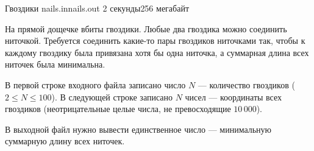 \begin{problem}{Гвоздики}
{nails.in}{nails.out}
{2 секунды}{256 мегабайт}

На прямой дощечке вбиты гвоздики. Любые два гвоздика можно 
соединить ниточкой. Требуется соединить какие-то 
пары гвоздиков ниточками так, чтобы к каждому гвоздику 
была привязана хотя бы одна ниточка, а суммарная длина всех 
ниточек была минимальна.

\InputFile

В первой строке входного файла записано число $N$ --- количество 
гвоздиков ($2 \le N \le 100$). В следующей строке записано $N$ чисел 
--- координаты всех гвоздиков (неотрицательные целые числа, не превосходящие 
$10\,000$).

\OutputFile

В выходной файл нужно вывести единственное число --- минимальную 
суммарную длину всех ниточек.

\Example

\begin{example}
%
\end{example}

\end{problem}
